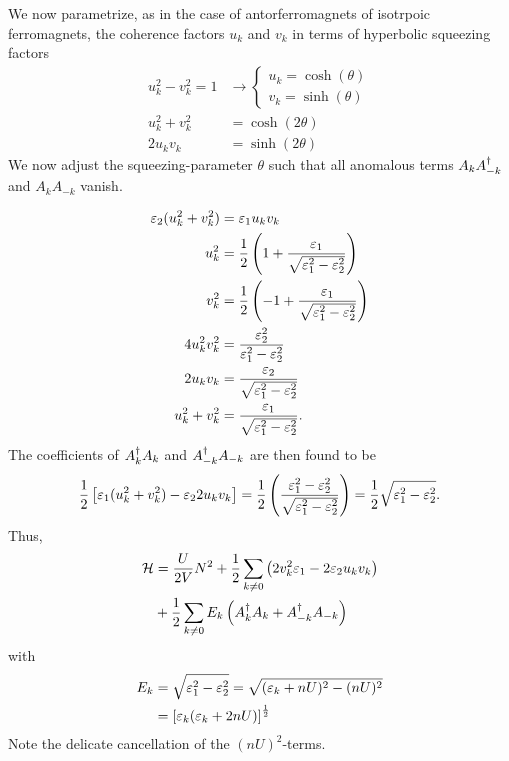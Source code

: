 We now parametrize, as in the case of antorferromagnets of isotrpoic ferromagnets, the coherence factors $u_k$ and $v_k$ in terms of hyperbolic squeezing factors
\begin{align*}
	u_k^2-v_k^2 = 1 &\rightarrow \begin{cases*}
		u_k = \cosh(\theta) \\
		v_k = \sinh(\theta)
	\end{cases*} \\
	u_k^2 + v_k^2 &= \cosh(2\theta) \\
	2u_kv_k &= \sinh(2\theta)
\end{align*}
We now adjust the squeezing-parameter $\theta$ such that all anomalous terms $A_{k}A_{-k}^{\dagger}$ and  $A_{k}A_{-k}$ vanish.

\begin{align*}
	\varepsilon_2(u_k^2 + v_k^2) &= \varepsilon_1u_kv_k \\
	u_k^2 &= \frac{1}{2}\left (1 +\frac{\varepsilon_1}{\sqrt{\varepsilon_1^2-\varepsilon_2^2}}\right ) \\
	v_k^2 &= \frac{1}{2}\left (-1 +\frac{\varepsilon_1}{\sqrt{\varepsilon_1^2-\varepsilon_2^2}}\right )  \\
	4u_k^2v_k^2 &= \frac{\varepsilon_2^2}{\varepsilon_1^2-\varepsilon_2^2} \\
	2u_kv_k &= \frac{\varepsilon_2}{\sqrt{\varepsilon_1^2-\varepsilon_2^2}} \\
	u_k^2 + v_k^2 &= \frac{\varepsilon_1}{\sqrt{\varepsilon_1^2-\varepsilon_2^2}}.
\end{align*}
The coefficients of $A_{k}^{\dagger}A_{k}$ and  $A_{-k}^{\dagger}A_{-k}$ are then found to be
\begin{equation}
	\frac{1}{2}\left [\varepsilon_1(u_k^2 + v_k^2) -\varepsilon_2 2u_kv_k\right ] = \frac{1}{2}\left (\frac{\varepsilon_1^2-\varepsilon_2^2}{\sqrt{\varepsilon_1^2-\varepsilon_2^2}}\right ) = \frac{1}{2}\sqrt{\varepsilon_1^2-\varepsilon_2^2}.
\end{equation}
Thus,
\begin{equation}
	\begin{aligned}
		\mathcal{H} &= \frac{U}{2V}N^2 + \frac{1}{2}\sum_{k\ne0}\left (2v_k^2\varepsilon_1 - 2\varepsilon_2 u_kv_k\right ) \\
		&+ \frac{1}{2}\sum_{k\ne0}E_k\left (A_{k}^{\dagger}A_{k} + A_{-k}^{\dagger}A_{-k}\right )
	\end{aligned}
\end{equation}
with
\begin{equation}
	\begin{aligned}
	E_k &= \sqrt{\varepsilon_1^2-\varepsilon_2^2} = \sqrt{(\varepsilon_k + nU)^2-(nU)^2} \\
	&= \left [\varepsilon_k(\varepsilon_k + 2nU)\right ]^{\frac{1}{2}}
	\end{aligned}
\end{equation}
Note the delicate cancellation of the $(nU)^2$-terms.

